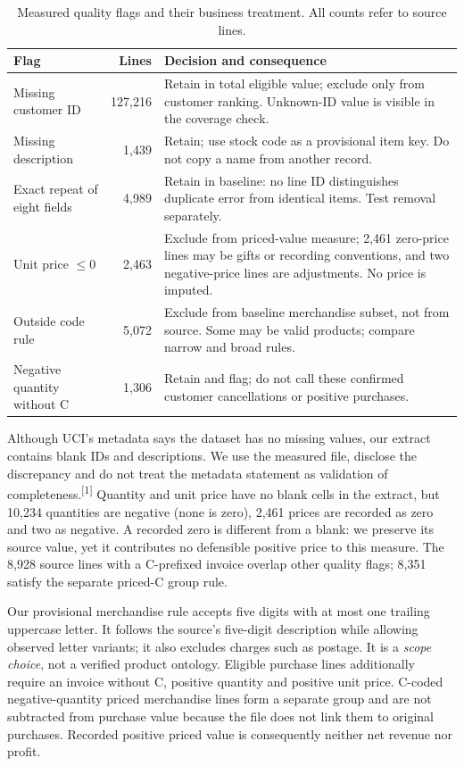\documentclass[10pt,a4paper]{article}
\newcommand{\source}[1]{\textsuperscript{[#1]}}
\begin{document}
\begin{table}[H]\centering\small
\caption{Measured quality flags and their business treatment. All counts refer to source lines.}
\begin{tabularx}{\linewidth}{@{}>{\raggedright\arraybackslash}p{2.85cm}rX@{}}\toprule
Flag & Lines & Decision and consequence \\\midrule
Missing customer ID & 127,216 & Retain in total eligible value; exclude only from customer ranking. Unknown-ID value is visible in the coverage check. \\
Missing description & 1,439 & Retain; use stock code as a provisional item key. Do not copy a name from another record. \\
Exact repeat of eight fields & 4,989 & Retain in baseline: no line ID distinguishes duplicate error from identical items. Test removal separately. \\
Unit price $\leq0$ & 2,463 & Exclude from priced-value measure; 2,461 zero-price lines may be gifts or recording conventions, and two negative-price lines are adjustments. No price is imputed. \\
Outside code rule & 5,072 & Exclude from baseline merchandise subset, not from source. Some may be valid products; compare narrow and broad rules. \\
Negative quantity without C & 1,306 & Retain and flag; do not call these confirmed customer cancellations or positive purchases. \\
\bottomrule\end{tabularx}
\end{table}

Although UCI's metadata says the dataset has no missing values, our extract contains blank IDs and descriptions. We use the measured file, disclose the discrepancy and do not treat the metadata statement as validation of completeness.\source{1} Quantity and unit price have no blank cells in the extract, but 10,234 quantities are negative (none is zero), 2,461 prices are recorded as zero and two as negative. A recorded zero is different from a blank: we preserve its source value, yet it contributes no defensible positive price to this measure. The 8,928 source lines with a C-prefixed invoice overlap other quality flags; 8,351 satisfy the separate priced-C group rule.

Our provisional merchandise rule accepts five digits with at most one trailing uppercase letter. It follows the source's five-digit description while allowing observed letter variants; it also excludes charges such as postage. It is a \emph{scope choice}, not a verified product ontology. Eligible purchase lines additionally require an invoice without C, positive quantity and positive unit price. C-coded negative-quantity priced merchandise lines form a separate group and are not subtracted from purchase value because the file does not link them to original purchases. Recorded positive priced value is consequently neither net revenue nor profit.
\end{document}
